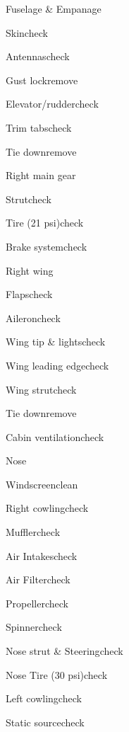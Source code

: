 \begin{multicols}{2}
\begin{checklist}{Fuselage \& Empanage}
  \item{Skin}{check}
  \item{Antennas}{check}
  \item{Gust lock}{remove}
  \item{Elevator/rudder}{check}
  \item{Trim tabs}{check}
  \item{Tie down}{remove}
\end{checklist}

\begin{checklist}{Right main gear}
  \item{Strut}{check}
  \item{Tire (21 psi)}{check}
  \item{Brake system}{check}
\end{checklist}

\begin{checklist}{Right wing}
  \item{Flaps}{check}
  \item{Aileron}{check}
  \item{Wing tip \& lights}{check}
  \item{Wing leading edge}{check}
  \item{Wing strut}{check}
  \item{Tie down}{remove}
  \item{Cabin ventilation}{check}
\end{checklist}

\begin{checklist}{Nose}
  \item{Windscreen}{clean}
  \item{Right cowling}{check}
  \item{Muffler}{check}
  \item{Air Intakes}{check}
  \item{Air Filter}{check}
  \item{Propeller}{check}
  \item{Spinner}{check}
  \item{Nose strut \& Steering}{check}
  \item{Nose Tire (30 psi)}{check}
  \item{Left cowling}{check}
  \item{Static source}{check}
\end{checklist}
\end{multicols}
